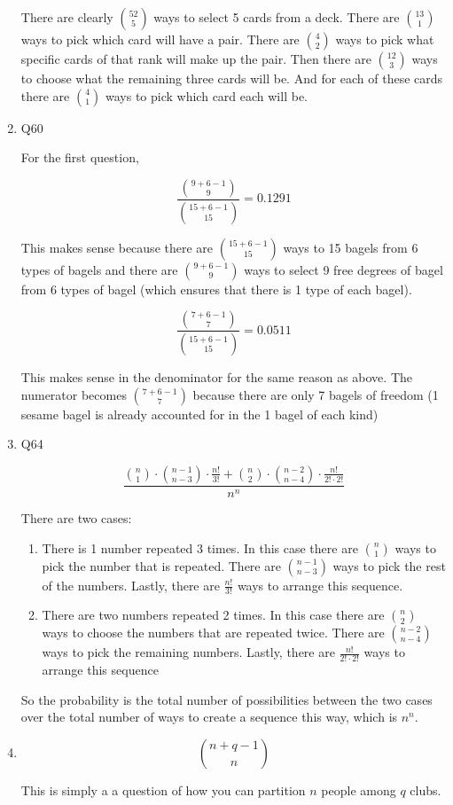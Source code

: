 \documentclass[12pt]{exam}
\begin{document}
\begin{enumerate}
There are clearly $\binom{52}{5}$ ways to select 5 cards from a deck. There are $\binom{13}{1}$ ways to pick which card will have a pair. There are $\binom{4}{2}$ ways to pick what specific cards of that rank will make up the pair. Then there are $\binom{12}{3}$ ways to choose what the remaining three cards will be. And for each of these cards there are $\binom{4}{1}$ ways to pick which card each will be. 

\item Q60

For the first question, 

$$
\frac{\binom{9 + 6 - 1}{9}}{\binom{15 + 6 - 1}{15}} = 0.1291
$$

This makes sense because there are $\binom{15 + 6 - 1}{15}$ ways to 15 bagels from 6 types of bagels and there are $\binom{9 + 6 - 1}{9}$ ways to select 9 free degrees of bagel from 6 types of bagel (which ensures that there is 1 type of each bagel). 

$$
\frac{\binom{7 + 6 - 1}{7}}{\binom{15 + 6 - 1}{15}} = 0.0511
$$

This makes sense in the denominator for the same reason as above. The numerator becomes $\binom{7 + 6 - 1}{7}$ because there are only 7 bagels of freedom (1 sesame bagel is already accounted for in the 1 bagel of each kind)

\item Q64

$$
\frac{\binom{n}{1} \cdot \binom{n - 1}{n - 3} \cdot \frac{n!}{3!} + \binom{n}{2} \cdot \binom{n - 2}{n - 4} \cdot \frac{n!}{2! \cdot 2!}}{n^n}
$$

There are two cases: 

\begin{enumerate}
    \item There is 1 number repeated 3 times. In this case there are $\binom{n}{1}$ ways to pick the number that is repeated. There are $\binom{n - 1}{n - 3}$ ways to pick the rest of the numbers. Lastly, there are $\frac{n!}{3!}$ ways to arrange this sequence. 
    \item There are two numbers repeated 2 times. In this case there are $\binom{n}{2}$ ways to choose the numbers that are repeated twice. There are $\binom{n - 2}{n - 4}$ ways to pick the remaining numbers. Lastly, there are $\frac{n!}{2! \cdot 2!}$ ways to arrange this sequence
\end{enumerate}

So the probability is the total number of possibilities between the two cases over the total number of ways to create a sequence this way, which is $n^n$.

\item 

$$\binom{n + q - 1}{n}$$

This is simply a a question of how you can partition $n$ people among $q$ clubs. 

\end{enumerate}
\end{document}
